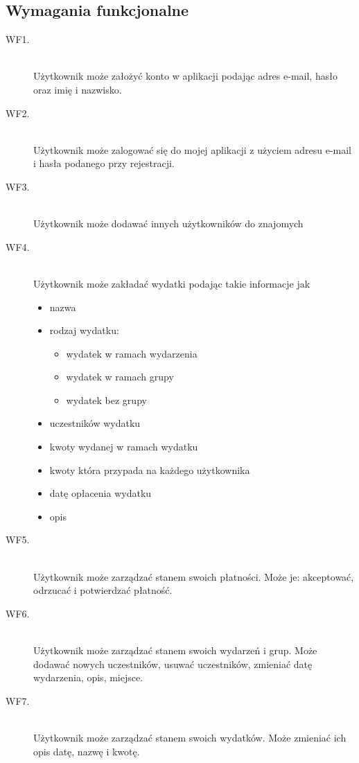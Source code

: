 \subsection{Wymagania funkcjonalne}
\begin{description}
  \item[WF1.] \hfill \\ Użytkownik może założyć konto w aplikacji podając adres e-mail, hasło oraz imię i nazwisko.
  \item[WF2.] \hfill \\ Użytkownik może zalogować się do mojej aplikacji z użyciem adresu e-mail i hasła podanego przy rejestracji.
  \item[WF3.] \hfill \\ Użytkownik może dodawać innych użytkowników do znajomych
  \item[WF4.] \hfill \\ Użytkownik może zakładać wydatki podając takie informacje jak
    \begin{itemize}
      \item nazwa
      \item rodzaj wydatku: 
        \begin{itemize}
          \item wydatek w ramach wydarzenia
          \item wydatek w ramach grupy
          \item wydatek bez grupy
        \end{itemize}
      \item uczestników wydatku
      \item kwoty wydanej w ramach wydatku
      \item kwoty która przypada na każdego użytkownika
      \item datę opłacenia wydatku
      \item opis
    \end{itemize}
  \item[WF5.] \hfill \\ Użytkownik może zarządzać stanem swoich płatności. Może je: akceptować, odrzucać i potwierdzać płatność.
  \item[WF6.] \hfill \\ Użytkownik może zarządzać stanem swoich wydarzeń i grup. Może dodawać nowych uczestników, usuwać uczestników, zmieniać datę wydarzenia, opis, miejsce.
  \item[WF7.] \hfill \\ Użytkownik może zarządzać stanem swoich wydatków. Może zmieniać ich opis datę, nazwę i kwotę.

\end{description}
